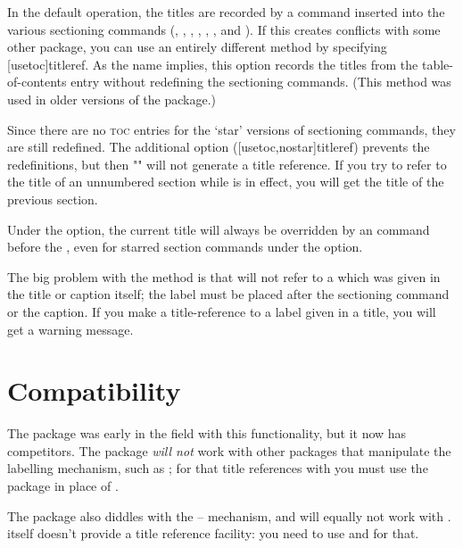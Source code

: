 \documentclass[a4paper]{article}
\begin{document}
In the default operation, the titles are recorded by a command
inserted into the various sectioning commands (,
, , , , ,
and ).  If this creates conflicts with some other
package, you can use an entirely different method by specifying
[usetoc]{titleref}.  As the name implies, this
option records the titles from the table-of-contents entry without
redefining the sectioning commands.  (This method was used in older
versions of the package.)

Since there are no \textsc{toc} entries for the `star' versions of
sectioning commands, they are still redefined.  The additional option
\option[nostar] ([usetoc,nostar]{titleref})
prevents the redefinitions, but then "" will not generate
a title reference.  If you try to refer to the title of an unnumbered
section while \option[nostar] is in effect, you will get the title of
the previous section.

Under the \option[usetoc] option, the current title will always be
overridden by an  command before the ,
even for starred section commands under the \option[nostar] option.

The big problem with the \option[usetoc] method is that 
will not refer to a  which was given in the title or caption
itself; the label must be placed after the sectioning command or the
caption.  If you make a title-reference to a label given in a title,
you will get a warning message.

\section*{Compatibility}

The package was early in the field with this functionality, but it now
has competitors.  The package \emph{will not} work with other packages
that manipulate the labelling mechanism, such as ;
for that title references with  you must use the
 package in place of .

The  package also diddles with the --
mechanism, and will equally not work with .
 itself doesn't provide a title reference facility: you
need to use  and  for that.
\end{document}
